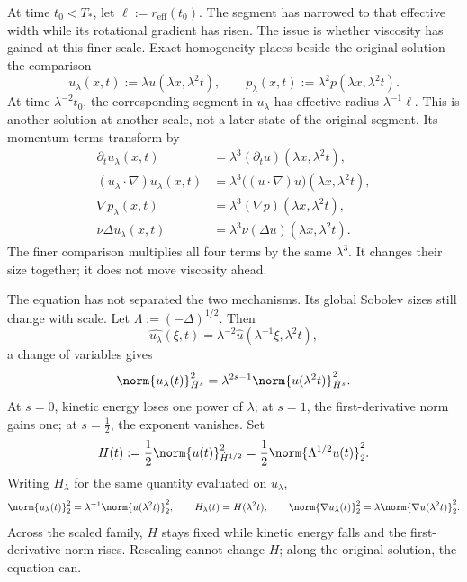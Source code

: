 
At time \(t_0<T_*\), let \(\ell:=r_{\mathrm{eff}}(t_0)\). The segment has narrowed to that effective width while its rotational gradient has risen. The issue is whether viscosity has gained at this finer scale. Exact \NavierStokes{} homogeneity places beside the original solution the comparison
\[
  u_\lambda(x,t)
  :=
  \lambda u(\lambda x,\lambda^2t),
  \qquad
  p_\lambda(x,t)
  :=
  \lambda^2p(\lambda x,\lambda^2t).
\]
At time \(\lambda^{-2}t_0\), the corresponding segment in \(u_\lambda\) has effective radius \(\lambda^{-1}\ell\). This is another solution at another scale, not a later state of the original segment. Its momentum terms transform by
\[
\begin{aligned}
  \partial_tu_\lambda(x,t)
  &=
  \lambda^3(\partial_tu)(\lambda x,\lambda^2t),
  \\
  (u_\lambda\cdot\nabla)u_\lambda(x,t)
  &=
  \lambda^3\bigl((u\cdot\nabla)u\bigr)(\lambda x,\lambda^2t),
  \\
  \nabla p_\lambda(x,t)
  &=
  \lambda^3(\nabla p)(\lambda x,\lambda^2t),
  \\
  \nu\Delta u_\lambda(x,t)
  &=
  \lambda^3\nu(\Delta u)(\lambda x,\lambda^2t).
\end{aligned}
\]
The finer comparison multiplies all four terms by the same \(\lambda^3\). It changes their size together; it does not move viscosity ahead.


The equation has not separated the two mechanisms. Its global Sobolev sizes still change with scale. Let \(\Lambda:=(-\Delta)^{1/2}\). Then
\[
  \widehat{u_\lambda}(\xi,t)
  =
  \lambda^{-2}\widehat u(\lambda^{-1}\xi,\lambda^2t),
\]
a change of variables gives
\[
  \norm{u_\lambda(t)}_{\dot H^s}^2
  =
  \lambda^{2s-1}
  \norm{u(\lambda^2t)}_{\dot H^s}^2.
\]
At \(s=0\), kinetic energy loses one power of \(\lambda\); at \(s=1\), the first-derivative norm gains one; at \(s=\tfrac12\), the exponent vanishes. Set
\[
  H(t)
  :=
  \frac12\norm{u(t)}_{\dot H^{1/2}}^2
  =
  \frac12\norm{\Lambda^{1/2}u(t)}_2^2.
\]
Writing \(H_\lambda\) for the same quantity evaluated on \(u_\lambda\),
\[
  \norm{u_\lambda(t)}_2^2
  =
  \lambda^{-1}\norm{u(\lambda^2t)}_2^2,
  \qquad
  H_\lambda(t)=H(\lambda^2t),
  \qquad
  \norm{\nabla u_\lambda(t)}_2^2
  =
  \lambda\norm{\nabla u(\lambda^2t)}_2^2.
\]
Across the scaled family, \(H\) stays fixed while kinetic energy falls and the first-derivative norm rises. Rescaling cannot change \(H\); along the original solution, the equation can.

